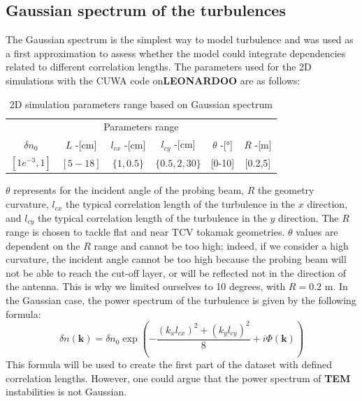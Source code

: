 \documentclass[11pt,openany]{report}
\begin{document}
\begin{multicols}{2}
    \subsection{Gaussian spectrum of the turbulences}
    The Gaussian spectrum is the simplest way to model turbulence and was used as a first approximation to assess whether the model could integrate dependencies related to different correlation lengths. The parameters used for the 2D simulations with the CUWA code on\textbf{LEONARDOO}  are as follows:
    \setlength{\tabcolsep}{.008\linewidth}
    \begin{table}
        \begin{tabular}{c|c|c|c|c|c}
            \toprule
            \multicolumn{6}{c}{Parameters range}                                                     \\
            \cmidrule{1 -6}
            $\delta n_0$   & $L$ -[cm] & $l_{cx}$ -[cm] & $l_{cy}$ -[cm]  & $\theta$ -[°] & $R$ -[m] \\
            \midrule
            $[1e^{-3}, 1]$ & $[5-18]$  & $\{1, 0.5 \}$  & $\{0.5,2,30 \}$ & [0-10]        & [0.2,5]  \\
            \bottomrule
        \end{tabular}
        \caption{2D simulation parameters range based on Gaussian spectrum}
        \label{Gaussian_table}
    \end{table}

    $\theta$ represents for the incident angle of the probing beam, $R$ the geometry curvature, $l_{cx}$ the typical correlation length of the turbulence in the $x$ direction, and $l_{cy}$ the typical correlation length of the turbulence in the $y$ direction. The $R$ range is chosen to tackle flat and near TCV tokamak geometries. $\theta$ values are dependent on the $R$ range and cannot be too high; indeed, if we consider a high curvature, the incident angle cannot be too high because the probing beam will not be able to reach the cut-off layer, or will be reflected not in the direction of the antenna. This is why we limited ourselves to 10 degrees, with $R = 0.2$ m. In the Gaussian case, the power spectrum of the turbulence is given by the following formula:
    $$
        \delta n(\textbf{k} ) = \delta n_0 \exp\left(-\frac{(k_x l_{cx})^2 + (k_y l_{cy})^2}{8} + i\Phi(\textbf{k} )\right)
    $$
    This formula will be used to create the first part of the dataset with defined correlation lengths. However, one could argue that the power spectrum of \textbf{TEM} instabilities is not Gaussian.


\end{multicols}
\end{document}
